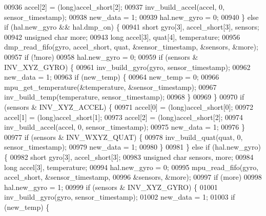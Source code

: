 \begin{DoxyCode}
00936             accel[2] = (long)accel\_short[2];
00937             inv\_build\_accel(accel, 0, sensor\_timestamp);
00938             new\_data = 1;
00939             hal.new_gyro = 0;
00940         \} \textcolor{keywordflow}{else} \textcolor{keywordflow}{if} (hal.new_gyro && hal.dmp_on) \{
00941             \textcolor{keywordtype}{short} gyro[3], accel\_short[3], sensors;
00942             \textcolor{keywordtype}{unsigned} \textcolor{keywordtype}{char} more;
00943             \textcolor{keywordtype}{long} accel[3], quat[4], temperature;
00956             dmp\_read\_fifo(gyro, accel\_short, quat, &sensor\_timestamp, &sensors, &more);
00957             \textcolor{keywordflow}{if} (!more)
00958                 hal.new_gyro = 0;
00959             \textcolor{keywordflow}{if} (sensors & INV\_XYZ\_GYRO) \{
00961                 inv\_build\_gyro(gyro, sensor\_timestamp);
00962                 new\_data = 1;
00963                 \textcolor{keywordflow}{if} (new\_temp) \{
00964                     new\_temp = 0;
00966                     mpu\_get\_temperature(&temperature, &sensor\_timestamp);
00967                     inv\_build\_temp(temperature, sensor\_timestamp);
00968                 \}
00969             \}
00970             \textcolor{keywordflow}{if} (sensors & INV\_XYZ\_ACCEL) \{
00971                 accel[0] = (long)accel\_short[0];
00972                 accel[1] = (long)accel\_short[1];
00973                 accel[2] = (long)accel\_short[2];
00974                 inv\_build\_accel(accel, 0, sensor\_timestamp);
00975                 new\_data = 1;
00976             \}
00977             \textcolor{keywordflow}{if} (sensors & INV\_WXYZ\_QUAT) \{
00978                 inv\_build\_quat(quat, 0, sensor\_timestamp);
00979                 new\_data = 1;
00980             \}
00981         \} \textcolor{keywordflow}{else} \textcolor{keywordflow}{if} (hal.new_gyro) \{
00982             \textcolor{keywordtype}{short} gyro[3], accel\_short[3];
00983             \textcolor{keywordtype}{unsigned} \textcolor{keywordtype}{char} sensors, more;
00984             \textcolor{keywordtype}{long} accel[3], temperature;
00994             hal.new_gyro = 0;
00995             mpu\_read\_fifo(gyro, accel\_short, &sensor\_timestamp,
00996                 &sensors, &more);
00997             \textcolor{keywordflow}{if} (more)
00998                 hal.new_gyro = 1;
00999             \textcolor{keywordflow}{if} (sensors & INV\_XYZ\_GYRO) \{
01001                 inv\_build\_gyro(gyro, sensor\_timestamp);
01002                 new\_data = 1;
01003                 \textcolor{keywordflow}{if} (new\_temp) \{

\end{DoxyCode}
